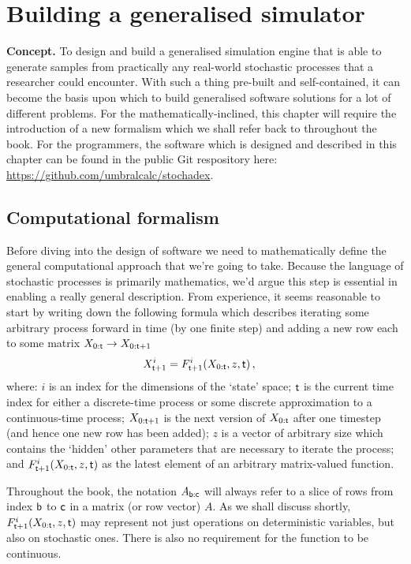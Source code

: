 \chapter{\sffamily Building a generalised simulator}

{\bfseries\sffamily Concept.} To design and build a generalised simulation engine that is able to generate samples from practically any real-world stochastic processes that a researcher could encounter. With such a thing pre-built and self-contained, it can become the basis upon which to build generalised software solutions for a lot of different problems. For the mathematically-inclined, this chapter will require the introduction of a new formalism which we shall refer back to throughout the book. For the programmers, the software which is designed and described in this chapter can be found in the public Git respository here: \href{https://github.com/umbralcalc/stochadex}{https://github.com/umbralcalc/stochadex}.

\section{\sffamily Computational formalism}

Before diving into the design of software we need to mathematically define the general computational approach that we're going to take. Because the language of stochastic processes is primarily mathematics, we'd argue this step is essential in enabling a really general description. From experience, it seems reasonable to start by writing down the following formula which describes iterating some arbitrary process forward in time (by one finite step) and adding a new row each to some matrix $X_{0:{\sf t}} \rightarrow X_{0:{\sf t}+1}$
\begin{align}
X^{i}_{{\sf t}+1} &= F^{i}_{{\sf t}+1}(X_{0:{\sf t}},z,{\sf t}) \,, \label{eq:x-step-def}
\end{align}
where: $i$ is an index for the dimensions of the `state' space; ${\sf t}$ is the current time index for either a discrete-time process or some discrete approximation to a continuous-time process; $X_{0:{\sf t}+1}$ is the next version of $X_{0:{\sf t}}$ after one timestep (and hence one new row has been added); $z$ is a vector of arbitrary size which contains the `hidden' other parameters that are necessary to iterate the process; and $F^i_{{\sf t}+1}(X_{0:{\sf t}},z,{\sf t})$ as the latest element of an arbitrary matrix-valued function. 

Throughout the book, the notation $A_{{{\sf b}:{\sf c}}}$ will always refer to a slice of rows from index ${\sf b}$ to ${\sf c}$ in a matrix (or row vector) $A$. As we shall discuss shortly, $F^i_{{\sf t}+1}(X_{0:{\sf t}},z,{\sf t})$ may represent not just operations on deterministic variables, but also on stochastic ones. There is also no requirement for the function to be continuous.

